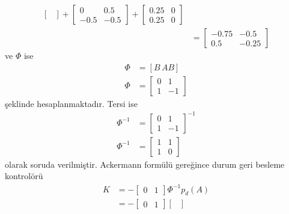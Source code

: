 \begin{enumerate}[\bfseries S1.]
\begin{equation}
\begin{split}
\begin{bmatrix}
        \end{bmatrix}+\begin{bmatrix}
        0& 0.5\\-0.5& -0.5\end{bmatrix}
        +\begin{bmatrix}
            0.25& 0\\0.25& 0\end{bmatrix}\\
        &=\begin{bmatrix}
            -0.75&   -0.5\\
            0.5&   -0.25
        \end{bmatrix}
    \end{split}
    \end{equation}
    ve $\Phi$ ise 
    \begin{equation}
        \begin{split}
            \Phi&=[B\, AB]\\
            \Phi&=\begin{bmatrix}
            0& 1\\
            1& -1
            \end{bmatrix}
        \end{split}
    \end{equation}
    şeklinde hesaplanmaktadır. Tersi ise
    \begin{equation}
        \begin{split}
            \Phi^{-1}&=\begin{bmatrix}
            0& 1\\
            1& -1
            \end{bmatrix}^{-1}\\
            \Phi^{-1}&=\begin{bmatrix}
                1&     1\\
                1&     0
            \end{bmatrix}
        \end{split}
    \end{equation}
    olarak soruda verilmiştir. Ackermann formülü gereğince durum geri besleme kontrolörü
    \begin{equation}
        \begin{split}
            K&=-\begin{bmatrix}0& 1\end{bmatrix}\Phi^{-1}p_d(A)\\
            &=-\begin{bmatrix}0& 1\end{bmatrix}\begin{bmatrix}

\end{bmatrix}
\end{split}
\end{equation}
\end{enumerate}
